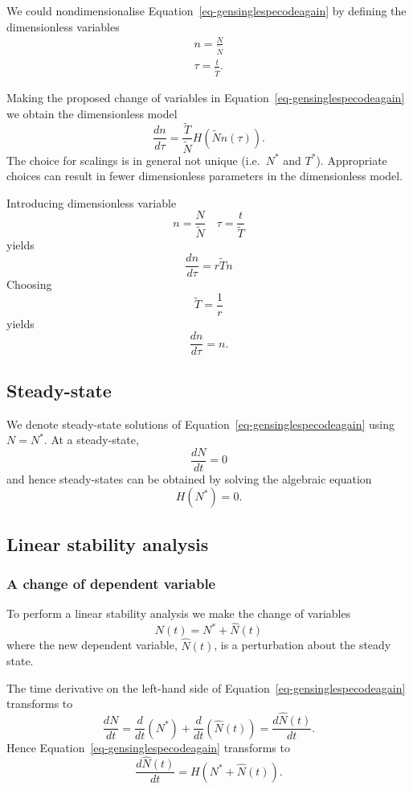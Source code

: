 \documentclass[
  letterpaper,
  DIV=11,
  numbers=noendperiod]{scrreprt}
\begin{document}
We could nondimensionalise Equation~\ref{eq-gensinglespecodeagain} by
defining the dimensionless variables \[
\begin{aligned}
n=\frac{N}{\tilde{N}} \nonumber \\
\tau=\frac{t}{\tilde{T}}.\nonumber
\end{aligned}
\]

Making the proposed change of variables in
Equation~\ref{eq-gensinglespecodeagain} we obtain the dimensionless
model \[
\frac{dn}{d\tau}= \frac{\tilde{T}}{\tilde{N}}H(\tilde{N}n(\tau)).
\] The choice for scalings is in general not unique (i.e.~\(N^*\) and
\(T^*\)). Appropriate choices can result in fewer dimensionless
parameters in the dimensionless model.

Introducing dimensionless variable \[
n=\frac{N}{\tilde{N}} \quad \tau=\frac{t}{\tilde{T}}
\] yields \[
\frac{dn}{d\tau}=r\tilde{T}n
\] Choosing \[
\tilde{T}=\frac{1}{r} 
\] yields \[
\frac{dn}{d\tau}=n.
\]

\subsection{Steady-state}\label{steady-state}

We denote steady-state solutions of
Equation~\ref{eq-gensinglespecodeagain} using \(N=N^*\). At a
steady-state, \[
\frac{dN}{dt}=0
\] and hence steady-states can be obtained by solving the algebraic
equation \[
H(N^*)=0.
\]

\subsection{Linear stability
analysis}\label{linear-stability-analysis-2}

\subsubsection{A change of dependent
variable}\label{a-change-of-dependent-variable}

To perform a linear stability analysis we make the change of variables
\[
N(t)=N^*+\hat{N}(t)
\] where the new dependent variable, \(\hat{N}(t)\), is a perturbation
about the steady state.

The time derivative on the left-hand side of
Equation~\ref{eq-gensinglespecodeagain} transforms to \[
\frac{dN}{dt}= \frac{d }{dt} (N^*) + \frac{d }{dt}(\hat{N}(t))=\frac{d\hat{N}(t) }{dt}.
\] Hence Equation~\ref{eq-gensinglespecodeagain} transforms to \[
\frac{d\hat{N}(t) }{dt} = H(N^*+\hat{N}(t)).
\]
\end{document}
